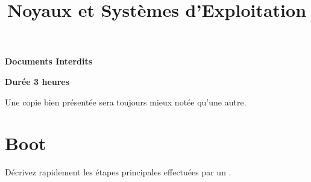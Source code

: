 %
%
%
%
%
%

%
%

%
%

\def\path{../../..}

%
%



%
%

\title{Noyaux et Syst\`emes d'Exploitation}

%
%

\rhead{}

%
%



%
%

\maketitle

%
%

\indentation{}

%
%

\begin{center}

\textbf{Documents Interdits}

\textbf{Dur\'ee 3 heures}

\scriptsize{Une copie bien pr\'esent\'ee sera toujours mieux not\'ee
            qu'une autre.}

\end{center}

%
%

%
%

\section{Boot
         {\hfill{} }}

D\'ecrivez rapidement les \'etapes principales effectu\'ees par un
.

